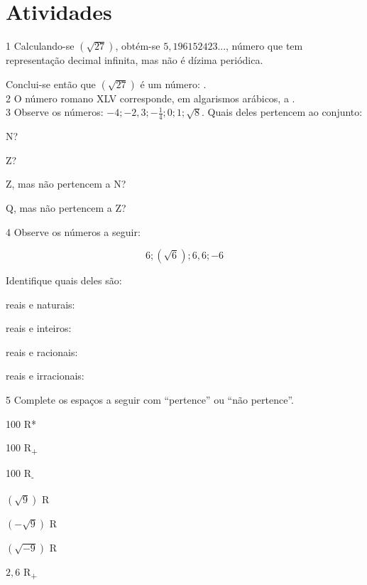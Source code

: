 \section*{Atividades}

\num{1} Calculando-se $(\sqrt{27})$, obtém-se $5,196152423$..., número que tem
representação decimal infinita, mas não é dízima periódica.

Conclui-se então que $(\sqrt{27})$ é um número:
.\\


\num{2} O número romano XLV corresponde, em algarismos arábicos, a
.\\

\num{3} Observe os números: $-4; -2,3; -\frac{1}{4}; 0; 1; \sqrt{8}$. Quais deles pertencem ao conjunto:





\begin{escolha}[itemsep=0pt]
\item N? 
\item Z? 
\item Z, mas não pertencem a N? 
\item Q, mas não pertencem a Z? 
\end{escolha}

\pagebreak

\num{4} Observe os números a seguir:

$$6; (\sqrt{6}); 6,6; -6$$


Identifique quais deles são:
\begin{escolha}[itemsep=0pt]
\item reais e naturais: \reduline{ -- 6\hfill}
\item reais e inteiros: 
\item reais e racionais: 
\item reais e irracionais: 
\end{escolha}


\num{5} Complete os espaços a seguir com ``pertence'' ou ``não pertence''.


\begin{escolha}[itemsep=0pt]
\item 100  R*
\item 100  R\textsubscript{+}
\item 100  R\textsubscript{-}
\item $(\sqrt{9})$  R
\item $(-\sqrt{9})$  R
\item $(\sqrt{- 9})$  R
\item $2,6$  R\textsubscript{+}
\end{escolha}


